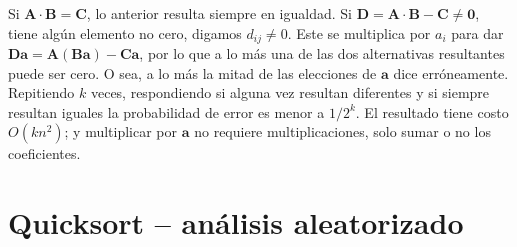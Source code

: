   Si \(\mathbf{A} \cdot \mathbf{B} = \mathbf{C}\),
  lo anterior resulta siempre en igualdad.
  Si \(\mathbf{D} = \mathbf{A} \cdot \mathbf{B} - \mathbf{C} \ne \mathbf{0}\),
  tiene algún elemento no cero,
  digamos \(d_{i j} \ne 0\).
  Este se multiplica por \(a_i\)
  para dar
    \(\mathbf{D} \mathbf{a}
        = \mathbf{A} (\mathbf{B} \mathbf{a}) - \mathbf{C} \mathbf{a}\),
  por lo que a lo más una de las dos alternativas resultantes puede ser cero.
  O sea,
  a lo más la mitad
  de las elecciones de \(\mathbf{a}\) dice  erróneamente.
  Repitiendo \(k\) veces,
  respondiendo  si alguna vez resultan diferentes
  y  si siempre resultan iguales
  la probabilidad de error es menor a \(1 / 2^k\).
  El resultado tiene costo \(O(k n^2)\);
  y multiplicar por \(\mathbf{a}\)  no requiere multiplicaciones,
  solo sumar o no los coeficientes.

\section{Quicksort -- análisis aleatorizado}
\label{sec:quicksort-aleatorizado}

